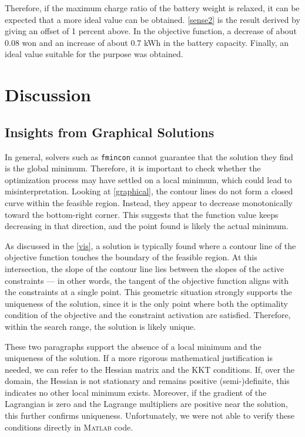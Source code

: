 \documentclass[11pt,twocolumn]{article}
\begin{document}
            Therefore, if the maximum charge ratio of the battery weight is relaxed, it can be expected that a more ideal value can be obtained.
            \cref{sense2} is the result derived by giving an offset of 1 percent above.
            In the objective function, a decrease of about 0.08 won and an increase of about 0.7 kWh in the battery capacity.
            Finally, an ideal value suitable for the purpose was obtained.
    \section{Discussion}
        \subsection{Insights from Graphical Solutions}
            In general, solvers such as \texttt{fmincon} cannot guarantee that the solution they find is the global minimum.
            Therefore, it is important to check whether the optimization process may have settled on a local minimum, which could lead to misinterpretation.
            Looking at \cref{graphical}, the contour lines do not form a closed curve within the feasible region.
            Instead, they appear to decrease monotonically toward the bottom-right corner.
            This suggests that the function value keeps decreasing in that direction, and the point found is likely the actual minimum.
            \par
            As discussed in the \cref{vis}, a solution is typically found where a contour line of the objective function touches the boundary of the feasible region.
            At this intersection, the slope of the contour line lies between the slopes of the active constraints — in other words, the tangent of the objective function aligns with the constraints at a single point.
            This geometric situation strongly supports the uniqueness of the solution, since it is the only point where both the optimality condition of the objective and the constraint activation are satisfied.
            Therefore, within the search range, the solution is likely unique.
            \par
            These two paragraphs support the absence of a local minimum and the uniqueness of the solution.
            If a more rigorous mathematical justification is needed, we can refer to the Hessian matrix and the KKT conditions.
            If, over the domain, the Hessian is not stationary and remains positive (semi-)definite, this indicates no other local minimum exists.
            Moreover, if the gradient of the Lagrangian is zero and the Lagrange multipliers are positive near the solution, this further confirms uniqueness.
            Unfortunately, we were not able to verify these conditions directly in \textsc{Matlab} code.
\end{document}
